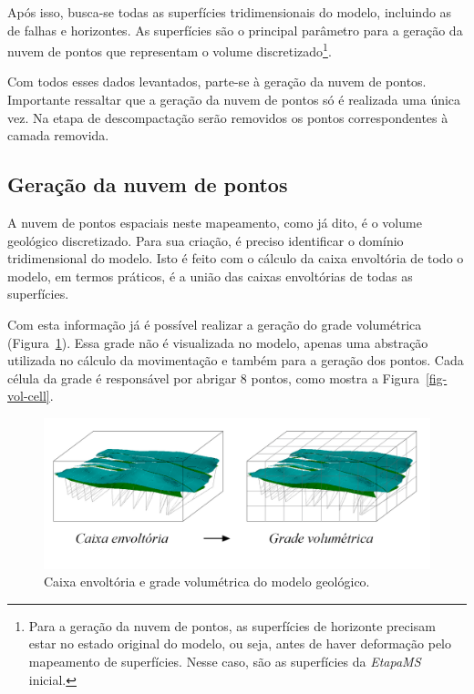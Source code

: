 Após isso, busca-se todas as superfícies tridimensionais do modelo, incluindo as de falhas e horizontes. As superfícies são o principal parâmetro para a geração da nuvem de pontos que representam o volume discretizado\footnote{Para a geração da nuvem de pontos, as superfícies de horizonte precisam estar no estado original do modelo, ou seja, antes de haver deformação pelo mapeamento de superfícies. Nesse caso, são as superfícies da \emph{EtapaMS} inicial.}.

Com todos esses dados levantados, parte-se à geração da nuvem de pontos. Importante ressaltar que a geração da nuvem de pontos só é realizada uma única vez. Na etapa de descompactação serão removidos os pontos correspondentes à camada removida.

\subsection{Geração da nuvem de pontos}\label{cloud-points-generation}

A nuvem de pontos espaciais neste mapeamento, como já dito, é o volume geológico discretizado. Para sua criação, é preciso identificar o domínio tridimensional do modelo. Isto é feito com o cálculo da caixa envoltória de todo o modelo, em termos práticos, é a união das caixas envoltórias de todas as superfícies.

Com esta informação já é possível realizar a geração do grade volumétrica (Figura~\ref{fig-vol-grid}). Essa grade não é visualizada no modelo, apenas uma abstração utilizada no cálculo da movimentação e também para a geração dos pontos. Cada célula da grade é responsável por abrigar 8 pontos, como mostra a Figura~\ref{fig-vol-cell}.

\begin{figure} [H]
  \begin{center}
    \includegraphics[width=\textwidth]{images/fig-vol-grid}
    \caption{Caixa envoltória e grade volumétrica do modelo geológico.}\label{fig-vol-grid}
  \end{center}
\end{figure}


